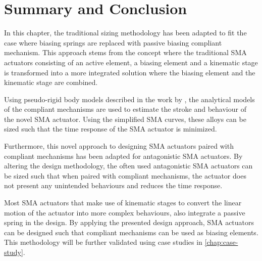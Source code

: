 \section{Summary and Conclusion}
In this chapter, the traditional sizing methodology has been adapted to fit the case where biasing springs are replaced with passive biasing compliant mechanism. This approach stems from the concept where the traditional SMA actuators consisting of an active element, a biasing element and a kinematic stage is transformed into a more integrated solution where the biasing element and the kinematic stage are combined.

Using pseudo-rigid body models described in the work by \cite{heneinConceptionStructuresArticulees2005}, the analytical models of the compliant mechanisms are used to estimate the stroke and behaviour of the novel SMA actuator. Using the simplified SMA curves, these alloys can be sized such that the time response of the SMA actuator is minimized.

Furthermore, this novel approach to designing SMA actuators paired with compliant mechanisms has been adapted for antagonistic SMA actuators. By altering the design methodology, the often used antagonistic SMA actuators can be sized such that when paired with compliant mechanisms, the actuator does not present any unintended behaviours and reduces the time response.

Most SMA actuators that make use of kinematic stages to convert the linear motion of the actuator into more complex behaviours, also integrate a passive spring in the design. By applying the presented design approach, SMA actuators can be designed such that compliant mechanisms can be used as biasing elements. This methodology will be further validated using case studies in \cref{chap:case-study}.
